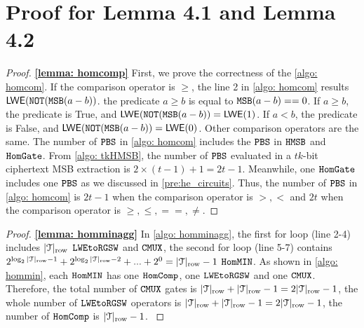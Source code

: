 
\section{Proof for Lemma 4.1 and Lemma 4.2}
\begin{proof} \textbf{\cref{lemma: homcomp}}
    First, we prove the correctness of the \cref{algo: homcom}.
    If the comparison operator is $\geq$, 
    the line 2 in \cref{algo: homcom} results 
    ${\mathsf{LWE}}(\texttt{NOT}(\texttt{MSB}(a-b))$.
    the predicate $a \geq b$ is equal to $\texttt{MSB}(a - b) == 0$.
    If $a \geq b$, the predicate is True, and ${\mathsf{LWE}}(\texttt{NOT}(\texttt{MSB}(a-b)) = {\mathsf{LWE}}(1)$. 
    If $a < b$, the predicate is False, and ${\mathsf{LWE}}(\texttt{NOT}(\texttt{MSB}(a-b)) = {\mathsf{LWE}}(0)$. 
    Other comparison operators are the same.
    The number of $\texttt{PBS}$ in \cref{algo: homcom}
    includes the $\texttt{PBS}$ in $\texttt{HMSB}$ and $\texttt{HomGate}$.
    From \cref{algo: tkHMSB}, the number of $\texttt{PBS}$ 
    evaluated in a $tk$-bit ciphertext
    MSB extraction is $2 \times (t - 1) + 1 = 2t - 1$.
    Meanwhile, one $\texttt{HomGate}$ 
    includes one $\texttt{PBS}$ as we discussed in \cref{pre:he_circuits}.
    Thus, the number of $\texttt{PBS}$ in \cref{algo: homcom} 
    is $2t-1$ when the comparison operator is $>,<$ and  $2t$  when the comparison operator is $\geq, \leq, ==, \ne$.
\end{proof}

\begin{proof} \textbf{\cref{lemma: homminagg}}
    In \cref{algo: homminagg}, the first for loop (line 2-4)
    includes $|\mathcal{T}|_{\rm row}$ $\texttt{LWEtoRGSW}$ and $\texttt{CMUX}$, the second for loop (line 5-7)
    contains $2^{\log_{2}{|\mathcal{T}|_{\rm row} - 1}} + 2^{\log_{2}{|\mathcal{T}|_{\rm row} - 2 }} 
    + ... + 2^{0} = |\mathcal{T}|_{\rm row} - 1$ ${\texttt{HomMIN}}$.
    As shown in \cref{algo: hommin}, each ${\texttt{HomMIN}}$ has one $\texttt{HomComp}$, 
    one $\texttt{LWEtoRGSW}$ and one $\texttt{CMUX}$.
    Therefore, the total number of $\texttt{CMUX}$ gates is $|\mathcal{T}|_{\rm row} + |\mathcal{T}|_{\rm row} - 1 = 2|\mathcal{T}|_{\rm row} - 1$, the whole number of $\texttt{LWEtoRGSW}$ operators is 
    $|\mathcal{T}|_{\rm row} + |\mathcal{T}|_{\rm row} - 1 = 2|\mathcal{T}|_{\rm row} - 1$, the number of 
    $\texttt{HomComp}$ is $|\mathcal{T}|_{\rm row} - 1$.
    \label{proof: homminagg}
\end{proof}


